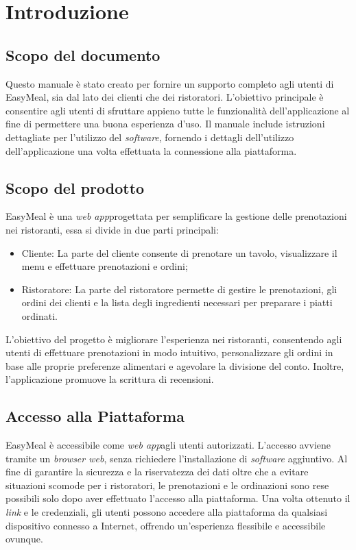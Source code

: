 \section{Introduzione}
\subsection{Scopo del documento}
Questo manuale è stato creato per fornire un supporto completo agli utenti di 
EasyMeal, sia dal lato dei clienti che dei ristoratori. 
L'obiettivo principale è consentire agli utenti di sfruttare appieno tutte le
funzionalità dell'applicazione al fine di permettere una buona esperienza d'uso. 
Il manuale include istruzioni dettagliate per l'utilizzo del \textit{software}, 
fornendo i dettagli dell'utilizzo dell'applicazione una volta effettuata la
connessione alla piattaforma.



\subsection{Scopo del prodotto}
EasyMeal è una \textit{web app}\g progettata per semplificare la gestione delle 
prenotazioni nei ristoranti, essa si divide in due parti principali:
\begin{itemize}
	\item Cliente\g: La parte del cliente consente di prenotare un tavolo, 
		visualizzare il menu e effettuare prenotazioni e ordini\g ;

	\item Ristoratore\g : La parte del ristoratore permette di gestire le 
		prenotazioni, gli ordini dei clienti e la lista degli ingredienti 
		necessari per preparare i piatti ordinati.
\end{itemize}

L'obiettivo del progetto è migliorare l'esperienza nei ristoranti, consentendo 
agli utenti di effettuare prenotazioni in modo intuitivo, personalizzare gli 
ordini in base alle proprie preferenze alimentari e agevolare la divisione del 
conto. Inoltre, l'applicazione promuove la scrittura di recensioni.

\subsection{Accesso alla Piattaforma}
EasyMeal è accessibile come \textit{web app}\g agli utenti autorizzati. 
L'accesso avviene tramite un \textit{browser web}, senza richiedere l'installazione di 
\textit{software} aggiuntivo.
Al fine di garantire la sicurezza e la riservatezza dei dati oltre che a evitare
situazioni scomode per i ristoratori, le prenotazioni e le ordinazioni sono rese
possibili solo dopo aver effettuato l'accesso alla piattaforma.
Una volta ottenuto il \textit{link} e le credenziali, gli utenti possono accedere alla 
piattaforma da qualsiasi dispositivo connesso a Internet, offrendo un'esperienza 
flessibile e accessibile ovunque.

